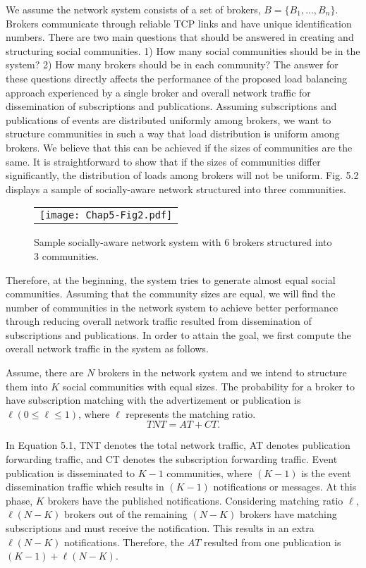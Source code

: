 We assume the network system consists of a set of brokers, $B=\{B_1,..., B_n\}$. Brokers communicate through reliable TCP links and have unique identification numbers. There are two main questions that should be answered in creating and structuring social communities. 1) How many social communities should be in the system? 2) How many brokers should be in each community? The answer for these questions directly affects the performance of the proposed load balancing approach experienced by a single broker and overall network traffic for dissemination of subscriptions and publications. Assuming subscriptions and publications of events are distributed uniformly among brokers, we want to structure communities in such a way that load distribution is uniform among brokers. We believe that this can be achieved if the sizes of communities are the same. It is straightforward to show that if the sizes of communities differ significantly, the distribution of loads among brokers will not be uniform. Fig. 5.2 displays a sample of socially-aware network structured into three communities.
\begin{figure}[t]
\begin{center}
  \begin{tabular}{c}
  \texttt{[image: Chap5-Fig2.pdf]}
  \end{tabular}
  \caption{Sample socially-aware network system with 6 brokers structured into 3 communities.}
\end{center}
\end{figure}

Therefore, at the beginning, the system tries to generate almost equal social communities. Assuming that the community sizes are equal, we will find the number of communities in the network system to achieve better performance through reducing overall network traffic resulted from dissemination of subscriptions and publications. In order to attain the goal, we first compute the overall network traffic in the system as follows.

Assume, there are $N$ brokers in the network system and we intend to structure them into $K$ social communities with equal sizes. The probability for a broker to have subscription matching with the advertizement or publication is $\ell(0\leq\ell\leq1)$, where $\ell$ represents the matching ratio.
\begin{equation}
TNT=AT+CT.
\end{equation}

In Equation 5.1, TNT denotes the total network traffic, AT denotes publication forwarding traffic, and CT denotes the subscription forwarding traffic. Event publication is disseminated to $K-1$ communities, where $(K-1)$ is the event dissemination traffic which results in $(K-1)$ notifications or messages. At this phase, $K$ brokers have the published notifications. Considering matching ratio $\ell$, $\ell(N-K)$ brokers out of the remaining $(N-K)$ brokers have matching subscriptions and must receive the notification. This results in an extra $\ell(N-K)$ notifications. Therefore, the $AT$ resulted from one publication is $(K-1)+\ell(N-K)$.

